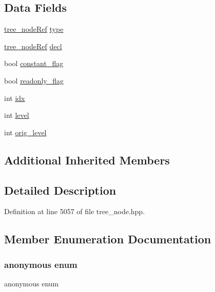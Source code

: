 \subsection*{Data Fields}
\begin{DoxyCompactItemize}
\item 
\hyperlink{tree__node_8hpp_a6ee377554d1c4871ad66a337eaa67fd5}{tree\+\_\+node\+Ref} \hyperlink{structtemplate__parm__index_a70d30acdc6ba55893510c97c1cc231b4}{type}
\item 
\hyperlink{tree__node_8hpp_a6ee377554d1c4871ad66a337eaa67fd5}{tree\+\_\+node\+Ref} \hyperlink{structtemplate__parm__index_a801c6ca992f71ef5ba0dcb9cc080a00d}{decl}
\item 
bool \hyperlink{structtemplate__parm__index_a9516be13be1e6c6f32f6129b706ca4b0}{constant\+\_\+flag}
\item 
bool \hyperlink{structtemplate__parm__index_aeddbeebec2bc4e728c2014174b129675}{readonly\+\_\+flag}
\item 
int \hyperlink{structtemplate__parm__index_a3bfa5843f69c40eea9ea8592ce575377}{idx}
\item 
int \hyperlink{structtemplate__parm__index_a15d8c42251ff2e713348329721ac15e4}{level}
\item 
int \hyperlink{structtemplate__parm__index_a144bc4e209141dbcf1072b1a71e810ae}{orig\+\_\+level}
\end{DoxyCompactItemize}
\subsection*{Additional Inherited Members}


\subsection{Detailed Description}


Definition at line 5057 of file tree\+\_\+node.\+hpp.



\subsection{Member Enumeration Documentation}
\mbox{\label{structtemplate__parm__index_abc1454ed1a6bfd29adbb7409d7324989}} 
\subsubsection{\texorpdfstring{anonymous enum}{anonymous enum}}
{\footnotesize\ttfamily anonymous enum}



